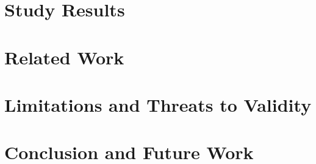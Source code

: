 \section{Study Results}
\label{sec:Study}




%


\section{Related Work}
\label{sec:Related}




\section{Limitations and Threats to Validity}
\label{sec:Limit}

\section{Conclusion and Future Work}
\label{sec:Conclusion}

















